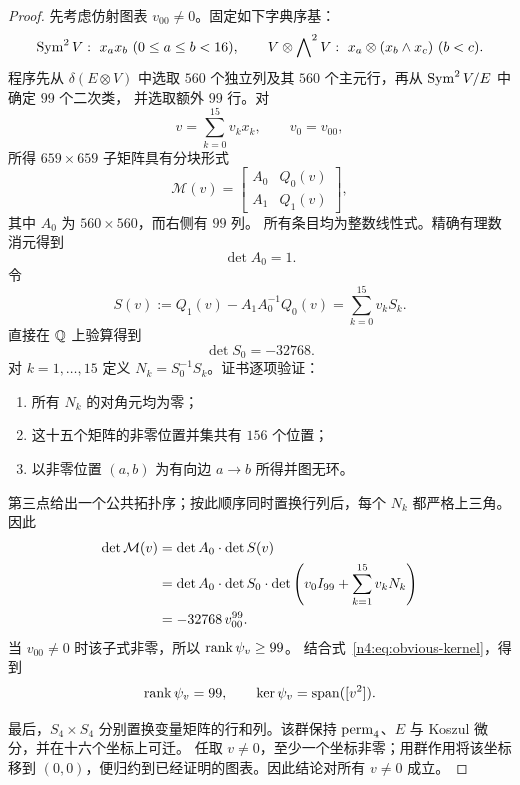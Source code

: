 \begin{proof}
先考虑仿射图表 \(v_{00}\neq0\)。固定如下字典序基：
\[
  \operatorname{Sym}^2V:\ x_ax_b\ (0\leq a\leq b<16),\qquad
  V\otimes\bigwedge\nolimits^2V:\
  x_a\otimes(x_b\wedge x_c)\ (b<c).
\]
程序先从 \(\delta(E\otimes V)\) 中选取 \(560\) 个独立列及其
\(560\) 个主元行，再从 \(\operatorname{Sym}^2V/E\) 中确定 \(99\) 个二次类，
并选取额外 \(99\) 行。对
\[
  v=\sum_{k=0}^{15}v_kx_k,\qquad v_0=v_{00},
\]
所得 \(659\times659\) 子矩阵具有分块形式
\begin{equation}\label{n4:eq:659}
  \mathcal M(v)=
  \begin{bmatrix}
    A_0&Q_0(v)\\
    A_1&Q_1(v)
  \end{bmatrix},
\end{equation}
其中 \(A_0\) 为 \(560\times560\)，而右侧有 \(99\) 列。
所有条目均为整数线性式。精确有理数消元得到
\[
  \det A_0=1.
\]
令
\[
  S(v):=Q_1(v)-A_1A_0^{-1}Q_0(v)
       =\sum_{k=0}^{15}v_kS_k.
\]
直接在 \(\mathbb Q\) 上验算得到
\begin{equation}\label{n4:eq:S0}
  \det S_0=-32768.
\end{equation}
对 \(k=1,\ldots,15\) 定义 \(N_k=S_0^{-1}S_k\)。证书逐项验证：
\begin{enumerate}[label=(\arabic*)]
  \item 所有 \(N_k\) 的对角元均为零；
  \item 这十五个矩阵的非零位置并集共有 \(156\) 个位置；
  \item 以非零位置 \((a,b)\) 为有向边 \(a\to b\) 所得并图无环。
\end{enumerate}
第三点给出一个公共拓扑序；按此顺序同时置换行列后，每个 \(N_k\)
都严格上三角。因此
\begin{align}
  \det\mathcal M(v)
  &=\det A_0\cdot\det S(v)\notag\\
  &=\det A_0\cdot\det S_0\cdot
    \det\left(v_0I_{99}+\sum_{k=1}^{15}v_kN_k\right)\notag\\
  &=-32768\,v_{00}^{99}.\label{n4:eq:chart-determinant}
\end{align}
当 \(v_{00}\neq0\) 时该子式非零，所以 \(\operatorname{rank}\psi_v\geq99\)。
结合式~\eqref{n4:eq:obvious-kernel}，得到
\[
  \operatorname{rank}\psi_v=99,\qquad
  \ker\psi_v=\operatorname{span}([v^2]).
\]

最后，\(S_4\times S_4\) 分别置换变量矩阵的行和列。该群保持
\(\operatorname{perm}_4\)、\(E\) 与 Koszul 微分，并在十六个坐标上可迁。
任取 \(v\neq0\)，至少一个坐标非零；用群作用将该坐标移到
\((0,0)\)，便归约到已经证明的图表。因此结论对所有 \(v\neq0\)
成立。
\end{proof}

